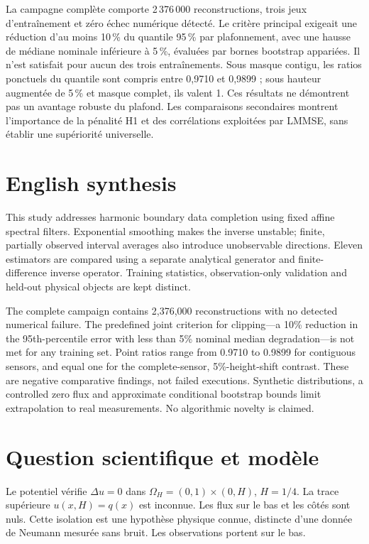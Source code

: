 \documentclass[11pt,a4paper]{article}
\begin{document}
La campagne complète comporte 2\,376\,000 reconstructions, trois jeux d'entraînement et zéro échec numérique détecté. Le critère principal exigeait une réduction d'au moins 10\,\% du quantile 95\,\% par plafonnement, avec une hausse de médiane nominale inférieure à 5\,\%, évaluées par bornes bootstrap appariées. Il n'est satisfait pour aucun des trois entraînements. Sous masque contigu, les ratios ponctuels du quantile sont compris entre 0,9710 et 0,9899 ; sous hauteur augmentée de 5\,\% et masque complet, ils valent 1. Ces résultats ne démontrent pas un avantage robuste du plafond. Les comparaisons secondaires montrent l'importance de la pénalité H1 et des corrélations exploitées par LMMSE, sans établir une supériorité universelle.

\section*{English synthesis}
This study addresses harmonic boundary data completion using fixed affine spectral filters. Exponential smoothing makes the inverse unstable; finite, partially observed interval averages also introduce unobservable directions. Eleven estimators are compared using a separate analytical generator and finite-difference inverse operator. Training statistics, observation-only validation and held-out physical objects are kept distinct.

The complete campaign contains 2,376,000 reconstructions with no detected numerical failure. The predefined joint criterion for clipping---a 10\% reduction in the 95th-percentile error with less than 5\% nominal median degradation---is not met for any training set. Point ratios range from 0.9710 to 0.9899 for contiguous sensors, and equal one for the complete-sensor, 5\%-height-shift contrast. These are negative comparative findings, not failed executions. Synthetic distributions, a controlled zero flux and approximate conditional bootstrap bounds limit extrapolation to real measurements. No algorithmic novelty is claimed.
\clearpage
\tableofcontents
\clearpage

\section{Question scientifique et modèle}
Le potentiel vérifie $\Delta u=0$ dans $\Omega_H=(0,1)\times(0,H)$, $H=1/4$. La trace supérieure $u(x,H)=q(x)$ est inconnue. Les flux sur le bas et les côtés sont nuls. Cette isolation est une hypothèse physique connue, distincte d'une donnée de Neumann mesurée sans bruit. Les observations portent sur le bas.
\end{document}
